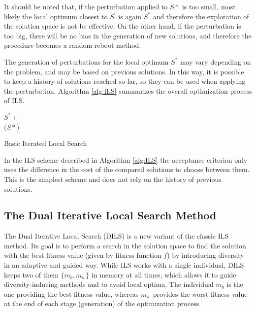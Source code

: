 It should be noted that, if the perturbation applied to $S*$ is too small, most likely the local optimum closest to $S^\prime$ is again $S^*$ and therefore the exploration of the solution space is not be effective. On the other hand, if the perturbation is too big, there will be no bias in the generation of new solutions, and therefore the procedure becomes a random-reboot method.

The generation of perturbations for the local optimum $S^*$ may vary depending on the problem, and may be based on previous solutions. In this way, it is possible to keep a history of solutions reached so far, so they can be used when applying the perturbation. Algorithm \ref{alg:ILS} summarizes the overall optimization process of \acs{ILS}.

\begin{algorithm}
	\SetNlSkip{0.5em}
	\BlankLine
	$S^* \leftarrow$ \\
	\BlankLine
	\KwRet ($S*$)
	
	\caption{Basic Iterated Local Search}\label{alg:ILS}
\end{algorithm}

In the \acs{ILS} scheme described in Algorithm \ref{alg:ILS} the acceptance criterion only uses the difference in the cost of the compared solutions to choose between them. This is the simplest scheme and does not rely on the history of previous solutions.

\subsection{The Dual Iterative Local Search Method}

The Dual Iterative Local Search (DILS) is a new variant of the classic ILS method. Its goal is to perform a search in the solution space to find the solution with the best fitness value (given by fitness function $f$) by introducing diversity in an adaptive and guided way. While ILS works with a single individual, DILS keeps two of them $\{m_b, m_w\}$ in memory at all times, which allows it to guide diversity-inducing methods and to avoid local optima. The individual $m_b$ is the one providing the best fitness value, whereas $m_w$ provides the worst fitness value at the end of each stage (generation) of the optimization process.


